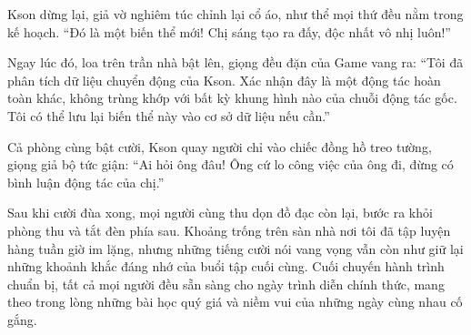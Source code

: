 ﻿\documentclass[../main.tex]{subfiles}
\begin{document}
Kson dừng lại, giả vờ nghiêm túc chỉnh lại cổ áo, như thể mọi thứ đều nằm trong kế hoạch. ``Đó là một biến thể mới! Chị sáng tạo ra đấy, độc nhất vô nhị luôn!''

Ngay lúc đó, loa trên trần nhà bật lên, giọng đều đặn của Game vang ra: ``Tôi đã phân tích dữ liệu chuyển động của Kson. Xác nhận đây là một động tác hoàn toàn khác, không trùng khớp với bất kỳ khung hình nào của chuỗi động tác gốc. Tôi có thể lưu lại biến thể này vào cơ sở dữ liệu nếu cần.''

Cả phòng cùng bật cười, Kson quay người chỉ vào chiếc đồng hồ treo tường, giọng giả bộ tức giận: ``Ai hỏi ông đâu! Ông cứ lo công việc của ông đi, đừng có bình luận động tác của chị.''

Sau khi cười đùa xong, mọi người cùng thu dọn đồ đạc còn lại, bước ra khỏi phòng thu và tắt đèn phía sau. Khoảng trống trên sàn nhà nơi tôi đã tập luyện hàng tuần giờ im lặng, nhưng những tiếng cười nói vang vọng vẫn còn như giữ lại những khoảnh khắc đáng nhớ của buổi tập cuối cùng. Cuối chuyến hành trình chuẩn bị, tất cả mọi người đều sẵn sàng cho ngày trình diễn chính thức, mang theo trong lòng những bài học quý giá và niềm vui của những ngày cùng nhau cố gắng.
\end{document}
